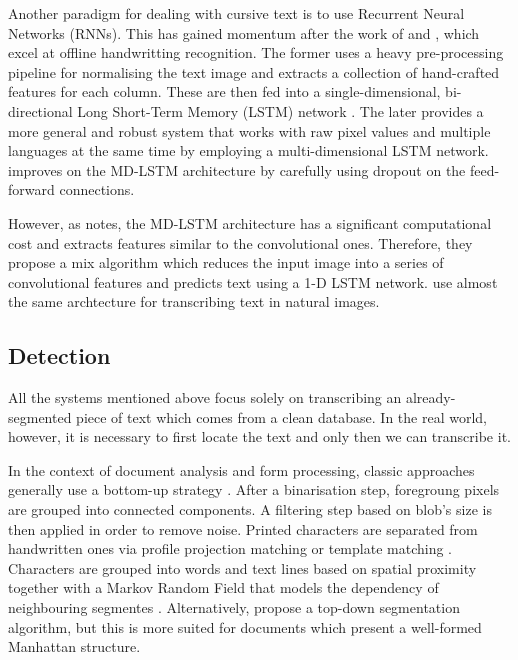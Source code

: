 		Another paradigm for dealing with cursive text is to use Recurrent Neural Networks (RNNs). This has gained momentum after the work of \citet{graves_LSTM} and \citet{graves_MDLSTM}, which excel at offline handwritting recognition. The former uses a heavy pre-processing pipeline for normalising the text image and extracts a collection of hand-crafted features for each column. These are then fed into a single-dimensional, bi-directional Long Short-Term Memory (LSTM) network \citep{LSTM_original}. The later provides a more general and robust system that works with raw pixel values and multiple languages at the same time by employing a multi-dimensional LSTM network.  improves on the MD-LSTM architecture by carefully using dropout on the feed-forward connections.

		However, as \citet{MDLSTM_vs_CNN} notes, the MD-LSTM architecture has a significant computational cost and extracts features similar to the convolutional ones. Therefore, they propose a mix algorithm which reduces the input image into a series of convolutional features and predicts text using a 1-D LSTM network.  use almost the same archtecture for transcribing text in natural images.


	\subsection{Detection}\label{sec:related_detection}
		All the systems mentioned above focus solely on transcribing an already-segmented piece of text which comes from a clean database. In the real world, however, it is necessary to first locate the text and only then we can transcribe it.

		In the context of document analysis and form processing, classic approaches generally use a bottom-up strategy \citep{bottom_up}. After a binarisation step, foregroung pixels are grouped into connected components. A filtering step based on blob's size is then applied in order to remove noise. Printed characters are separated from handwritten ones via profile projection matching \citep{profile_matching,moysset2014a2ia} or template matching \citep{template_matching}. Characters are grouped into words and text lines based on spatial proximity together with a Markov Random Field that models the dependency of neighbouring segmentes \citep{detection_mrf,detection_mrf2}. Alternatively, \citet{top_down} propose a top-down segmentation algorithm, but this is more suited for documents which present a well-formed Manhattan structure.

